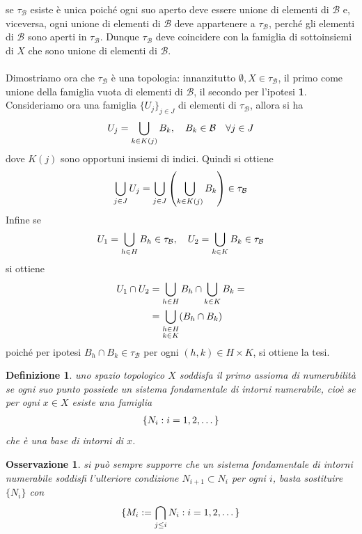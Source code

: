 \documentclass[oneside, 11pt]{amsbook}
\makeatletter
\newcommand{\0}{{(0)}}
\newcommand{\3}{{(3)}}
\theoremstyle{colonplain}
\theoremstyle{colondefinition}
\newtheorem{defn}[thm]{Definizione}
\theoremstyle{colonremark}
\newtheorem{rmk}[thm]{Osservazione}
\numberwithin{equation}{chapter}
\renewcommand{\proofname}{Dimostrazione}
\renewenvironment{proof}[1][\proofname]{\par
  \pushQED{\qed}%
  \normalfont \topsep6\p@\@plus6\p@\relax
  \trivlist
  \item[\hskip\labelsep\bfseries #1:]\ignorespaces
}{%
  \popQED\endtrivlist\@endpefalse
}
\makeatother
\begin{document}
\begin{proof} se $\tau_\mathcal{B}$ esiste è unica poiché ogni suo aperto deve essere unione di elementi di $\mathcal{B}$ e, viceversa, ogni unione di elementi di $\mathcal{B}$ deve appartenere a $\tau_\mathcal{B}$, perché gli elementi di $\mathcal{B}$ sono aperti in $\tau_\mathcal{B}$. Dunque $\tau_\mathcal{B}$ deve coincidere con la famiglia di sottoinsiemi di $X$ che sono unione di elementi di $\mathcal{B}$. \\ \\
Dimostriamo ora che $\tau_\mathcal{B}$ è una topologia: innanzitutto $\emptyset, X \in \tau_\mathcal{B}$, il primo come unione della famiglia vuota di elementi di $\mathcal{B}$, il secondo per l'ipotesi \textbf{1}. Consideriamo ora una famiglia $\{ U_j \}_{j \in J}$ di elementi di $\tau_\mathcal{B}$, allora si ha
\begin{align}
    U_j = \bigcup_{k \in K(j)} B_k, \quad B_k \in \mathcal{B} \quad \forall j \in J \notag
\end{align}
dove $K(j)$ sono opportuni insiemi di indici. Quindi si ottiene
\begin{align}
    \bigcup_{j \in J} U_j = \bigcup_{j \in J} \left( \bigcup_{k \in K(j)} B_k \right) \in \tau_\mathcal{B} \notag
\end{align}
Infine se
\begin{align}
    U_1 = \bigcup_{h \in H} B_h \in \tau_\mathcal{B}, \quad U_2 = \bigcup_{k \in K} B_k \in \tau_\mathcal{B} \notag
\end{align}
si ottiene
\begin{align}
    U_1 \cap U_2 &= \bigcup_{h \in H} B_h \cap \bigcup_{k \in K} B_k = \notag \\
    &= \bigcup_{\substack{h \in H \\ k \in K}} (B_h \cap B_k) \notag
\end{align}
poiché per ipotesi $B_h \cap B_k \in \tau_\mathcal{B}$ per ogni $(h, k) \in H \times K$, si ottiene la tesi.
\end{proof}
\begin{defn}
uno spazio topologico $X$ soddisfa \textit{il primo assioma di numerabilità} se ogni suo punto possiede un sistema fondamentale di intorni numerabile, cioè se per ogni $x \in X$ esiste una famiglia
\begin{align}
    \{ N_i : i = 1, 2, \dots \} \notag
\end{align}
che è una base di intorni di $x$.
\end{defn}
\begin{rmk}
si può sempre supporre che un sistema fondamentale di intorni numerabile soddisfi l'ulteriore condizione $N_{i + 1} \subset N_i$ per ogni $i$, basta sostituire $\{ N_i \}$ con
\begin{align}
    \{ M_i := \bigcap_{j \leq i} N_i : i = 1, 2, \dots \} \notag
\end{align}
\end{rmk}
\end{document}

